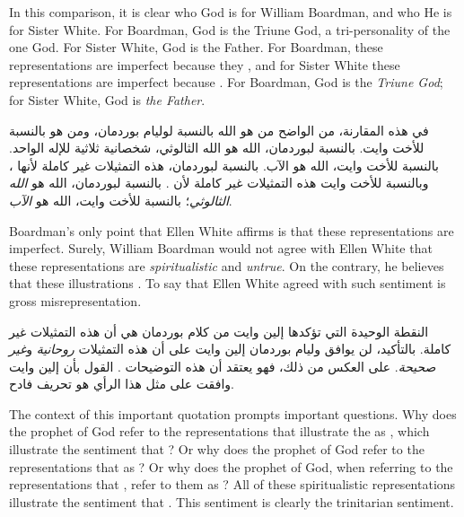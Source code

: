 In this comparison, it is clear who God is for William Boardman, and who He is for Sister White. For Boardman, God is the Triune God, a tri-personality of the one God. For Sister White, God is the Father. For Boardman, these representations are imperfect because they , and for Sister White these representations are imperfect because . For Boardman, God is the \textit{Triune God}; for Sister White, God is \textit{the Father}.


في هذه المقارنة، من الواضح من هو الله بالنسبة لوليام بوردمان، ومن هو بالنسبة للأخت وايت. بالنسبة لبوردمان، الله هو الله الثالوثي، شخصانية ثلاثية للإله الواحد. بالنسبة للأخت وايت، الله هو الآب. بالنسبة لبوردمان، هذه التمثيلات غير كاملة لأنها ، وبالنسبة للأخت وايت هذه التمثيلات غير كاملة لأن . بالنسبة لبوردمان، الله هو \textit{الله الثالوثي}؛ بالنسبة للأخت وايت، الله هو \textit{الآب}.


Boardman’s only point that Ellen White affirms is that these representations are imperfect. Surely, William Boardman would not agree with Ellen White that these representations are \textit{spiritualistic} and \textit{untrue}. On the contrary, he believes that these illustrations . To say that Ellen White agreed with such sentiment is gross misrepresentation.


النقطة الوحيدة التي تؤكدها إلين وايت من كلام بوردمان هي أن هذه التمثيلات غير كاملة. بالتأكيد، لن يوافق وليام بوردمان إلين وايت على أن هذه التمثيلات \textit{روحانية} و\textit{غير صحيحة}. على العكس من ذلك، فهو يعتقد أن هذه التوضيحات . القول بأن إلين وايت وافقت على مثل هذا الرأي هو تحريف فادح.


The context of this important quotation prompts important questions. Why does the prophet of God refer to the representations that illustrate the  as , which illustrate the sentiment that ? Or why does the prophet of God refer to the representations that  as ? Or why does the prophet of God, when referring to the representations that , refer to them as ? All of these spiritualistic representations illustrate the sentiment that . This sentiment is clearly the trinitarian sentiment.


